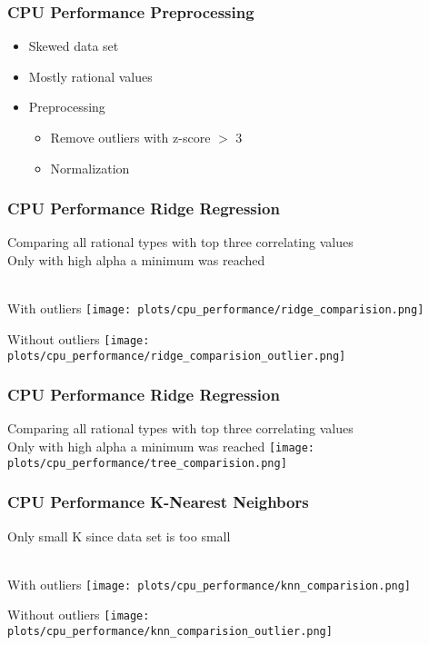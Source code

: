 \documentclass[aspectratio=169]{beamer}
\begin{document}
\begin{frame}{}
\frametitle{CPU Performance Preprocessing}
\begin{itemize}
\item Skewed data set
\item Mostly rational values
\item Preprocessing
\begin{itemize}
\item Remove outliers with z-score $>$ 3
\item Normalization
\end{itemize}
\end{itemize}
\end{frame}

\begin{frame}{}
\frametitle{CPU Performance Ridge Regression}
Comparing all rational types with top three correlating values \\
Only with high alpha a minimum was reached \\ ~\\

\begin{minipage}{0.49\textwidth}
\center With outliers
   \texttt{[image: plots/cpu\_performance/ridge\_comparision.png]}
\end{minipage}
 \begin{minipage}{0.49\textwidth}
 \center Without outliers
   \texttt{[image: plots/cpu\_performance/ridge\_comparision\_outlier.png]}
\end{minipage}
\end{frame}

\begin{frame}{}
\frametitle{CPU Performance Ridge Regression}
Comparing all rational types with top three correlating values\\Only with high alpha a minimum was reached
    \center \texttt{[image: plots/cpu\_performance/tree\_comparision.png]}
\end{frame}

\begin{frame}{}
\frametitle{CPU Performance K-Nearest Neighbors}
\center Only small K since data set is too small\\ ~\\
\begin{minipage}{0.49\textwidth}
\center With outliers
   \texttt{[image: plots/cpu\_performance/knn\_comparision.png]}
\end{minipage}
 \begin{minipage}{0.49\textwidth}
 \center Without outliers
   \texttt{[image: plots/cpu\_performance/knn\_comparision\_outlier.png]}
\end{minipage}
\end{frame}
\end{document}
